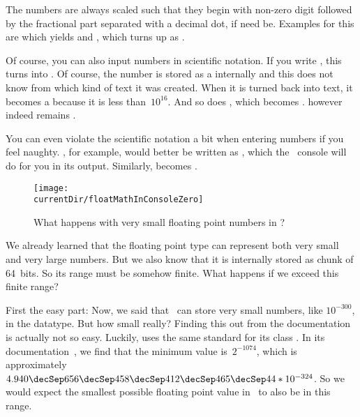 The numbers are always scaled such that they begin with non-zero digit followed by the fractional part separated with a decimal dot, if need be.
Examples for this are  which yields  and , which turns up as .

Of course, you can also input numbers in scientific notation.
If you write , this turns into .
Of course, the number is stored as a  internally and this  does not know from which kind of text it was created.
When it is turned back into text, it becomes a  because it is less than~$10^{16}$.
And so does , which becomes .
 however indeed remains .

You can even violate the scientific notation a bit when entering numbers if you feel naughty.
, for example, would better be written as , which the \python\ console will do for you in its output.
Similarly,  becomes .
\endhsection%
%
%
\label{sec:float:special}%
%
\begin{figure}%
\centering%
\texttt{[image: \\currentDir/floatMathInConsoleZero]}%
\caption{What happens with very small floating point numbers in \python?}%
\label{fig:floatMathInConsoleZero}%
\end{figure}%
%
We already learned that the floating point type  can represent both very small and very large numbers.
But we also know that it is internally stored as chunk of 64~bits.
So its range must be somehow finite.
What happens if we exceed this finite range?

First the easy part:
Now, we said that \python\ can store very small numbers, like $10^{-300}$, in the  datatype.
But how small really?
Finding this out from the documentation is actually not so easy.
Luckily,  uses the same standard for its class .
In its documentation~\cite{O2024CD}, we find that the minimum value is~$2^{-1074}$, which is approximately~$4.940\decSep656\decSep458\decSep412\decSep465\decSep44*10^{-324}$.
So we would expect the smallest possible floating point value in \python\ to also be in this range.

